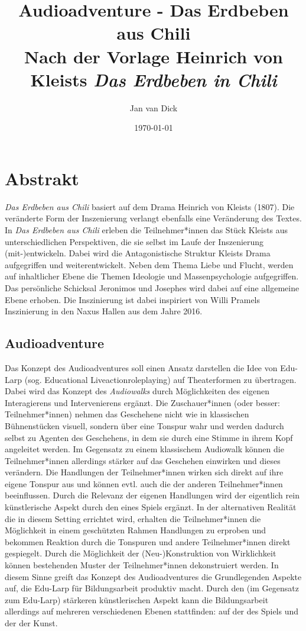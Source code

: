 \documentclass[a4paper, 12pt]{report}
\title{%
    Audioadventure - Das Erdbeben aus Chili \\
    \large Nach der Vorlage Heinrich von Kleists \textit{Das Erdbeben in Chili}}
\author{Jan van Dick}
\date{\today}
\newcommand\frontmatter{ \cleardoublepage \pagenumbering{roman}}
\begin{document}
\maketitle
\frontmatter


\chapter*{Abstrakt}
\textit{Das Erdbeben aus Chili} basiert auf dem Drama Heinrich von Kleists (1807). 
Die veränderte Form der Inszenierung verlangt ebenfalls eine Veränderung des Textes. 
In \textit{Das Erdbeben aus Chili} erleben die Teilnehmer*innen das Stück Kleists aus unterschiedlichen Perspektiven, die sie selbst im Laufe der Inszenierung (mit-)entwickeln.
Dabei wird die Antagonistische Struktur Kleists Drama aufgegriffen und weiterentwickelt. 
Neben dem Thema Liebe und Flucht, werden auf inhaltlicher Ebene die Themen Ideologie und Massenpsychologie aufgegriffen. 
Das persönliche Schicksal Jeronimos und Josephes wird dabei auf eine allgemeine Ebene erhoben.
Die Inszinierung ist dabei inspiriert von Willi Pramels Inszinierung in den Naxus Hallen aus dem Jahre 2016.

\section*{Audioadventure}
Das Konzept des \glqq Audioadventures\grqq{} soll einen Ansatz darstellen die Idee von Edu-Larp (sog. Educational Liveactionroleplaying) auf Theaterformen zu übertragen. 
Dabei wird das Konzept des \textit{Audiowalks} durch Möglichkeiten des eigenen Interagierens und Intervenierens ergänzt.
Die Zuschauer*innen (oder besser: Teilnehmer*innen) nehmen das Geschehene nicht wie in klassischen Bühnenstücken visuell, sondern über eine Tonspur wahr und werden dadurch selbst zu Agenten des Geschehens, in dem sie durch eine \glqq Stimme in ihrem Kopf\grqq{} angeleitet werden.
Im Gegensatz zu einem \glqq klassischem\grqq{} Audiowalk können die Teilnehmer*innen allerdings stärker auf das Geschehen einwirken und dieses verändern. 
Die Handlungen der Teilnehmer*innen wirken sich direkt auf ihre eigene Tonspur aus und können evtl. auch die der anderen Teilnehmer*innen beeinflussen.
Durch die Relevanz der eigenen Handlungen wird der eigentlich rein künstlerische Aspekt durch den eines Spiels ergänzt.
In der alternativen Realität die in diesem Setting errichtet wird, erhalten die Teilnehmer*innen die Möglichkeit in einem geschützten Rahmen Handlungen zu erproben und bekommen Reaktion durch die Tonspuren und andere Teilnehmer*innen direkt gespiegelt.
Durch die Möglichkeit der (Neu-)Konstruktion von Wirklichkeit können bestehenden Muster der Teilnehmer*innen dekonstruiert werden.
In diesem Sinne greift das Konzept des Audioadventures die Grundlegenden Aspekte auf, die Edu-Larp für Bildungsarbeit produktiv macht.
Durch den (im Gegensatz zum Edu-Larp) stärkeren künstlerischen Aspekt kann die Bildungsarbeit allerdings auf mehreren verschiedenen Ebenen stattfinden: auf der des Spiels und der der Kunst. 
\end{document}

